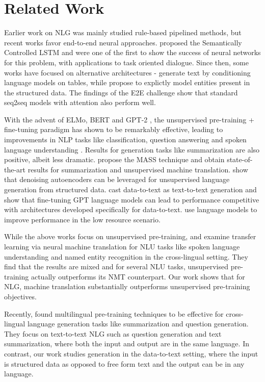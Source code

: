 \documentclass[11pt,a4paper]{article}
\begin{document}
\section{Related Work}
Earlier work on NLG was mainly studied rule-based pipelined methods, but recent works favor end-to-end neural approaches.  \citet{wen2015semantically} proposed the Semantically Controlled LSTM and were one of the first to show the success of neural networks for this problem, with applications to task oriented dialogue. Since then, some works have focused on alternative architectures - \citet{liu2018table} generate text by conditioning language models on tables, while \citet{puduppully2019data} propose to explictly model entities present in the structured data. The findings of the E2E challenge \citep{duvsek2018findings} show that standard seq2seq models with attention also perform well. \par
With the advent of ELMo, BERT \citep{devlin2018bert} and GPT-2 \citep{radford2019language}, the unsupervised pre-training + fine-tuning  paradigm has shown to be remarkably effective, leading to improvements in NLP tasks like classification, question answering and spoken language understanding \citep{siddhant2019unsupervised}. Results for generation tasks like summarization are also positive, albeit less dramatic. \citet{song2019mass} propose the MASS technique and obtain state-of-the-art results for summarization and unsupervised machine translation. \citet{freitag2018unsupervised} show that denoising autoencoders can be leveraged for unsupervised language generation from structured data. \citet{budzianowski2019hello} cast data-to-text as text-to-text generation and show that fine-tuning GPT language models can lead to performance competitive with architectures developed specifically for data-to-text. \citet{chen2019few} use language models to improve performance in the low resource scenario. \par
While the above works focus on unsupervised pre-training, \citet{siddhant2019evaluating} and \citet{schuster2018cross} examine transfer learning via neural machine translation for NLU tasks like spoken language understanding and named entity recognition in the cross-lingual setting. They find that the results are mixed and for several NLU tasks, unsupervised pre-training actually outperforms its NMT counterpart. Our work shows that for NLG, machine translation substantially outperforms unsupervised pre-training objectives. \par
Recently, \citet{chi2019cross} found multilingual pre-training techniques to be effective for cross-lingual language generation tasks like summarization and question generation. They focus on text-to-text NLG such as question generation and text summarization, where both the input and output are in the same language. In contrast, our work studies generation in the data-to-text setting, where the input is structured data as opposed to free form text and the output can be in any language. \par
\end{document}

